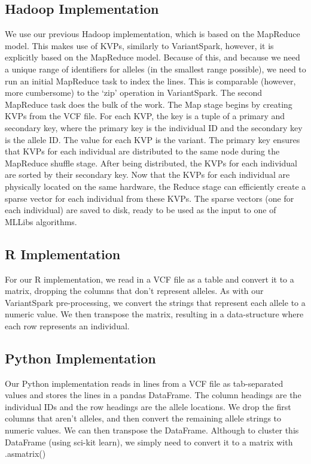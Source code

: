 \documentclass{bmcart}
\newcommand{\variantSpark}{{\sc VariantSpark}}
\begin{document}
\subsection*{Hadoop Implementation}
We use our previous Hadoop implementation, which is based on the MapReduce model. This makes use of KVPs, similarly to \variantSpark{}, however, it is explicitly based on the MapReduce model.
Because of this, and because we need a unique range of identifiers for alleles (in the smallest range possible), we need to run an initial MapReduce task to index the lines. This is comparable (however, more cumbersome) to the `zip' operation in \variantSpark{}.
The second MapReduce task does the bulk of the work. The Map stage begins by creating KVPs from the VCF file. For each KVP, the key is a tuple of a primary and secondary key, where the primary key is the individual ID and the secondary key is the allele ID. The value for each KVP is the variant.
The primary key ensures that KVPs for each individual are distributed to the same node during the MapReduce shuffle stage. After being distributed, the KVPs for each individual are sorted by their secondary key.
Now that the KVPs for each individual are physically located on the same hardware, the Reduce stage can efficiently create a sparse vector for each individual from these KVPs. The sparse vectors (one for each individual) are saved to disk, ready to be used as the input to one of MLLibs algorithms.


\subsection*{R Implementation}
For our R implementation, we read in a VCF file as a table and convert it to a matrix, dropping the columns that don't represent alleles. As with our \variantSpark{} pre-processing, we convert the strings that represent each allele to a numeric value.
We then transpose the matrix, resulting in a data-structure where each row represents an individual.


\subsection*{Python Implementation}
Our Python implementation reads in lines from a VCF file as tab-separated values and stores the lines in a pandas DataFrame. The column headings are the individual IDs and the row headings are the allele locations.
We drop the first columns that aren't alleles, and then convert the remaining allele strings to numeric values. We can then transpose the DataFrame. Although to cluster this DataFrame (using sci-kit learn), we simply need to convert it to a matrix with {\sc .as\textunderscore{}matrix()}
\end{document}
